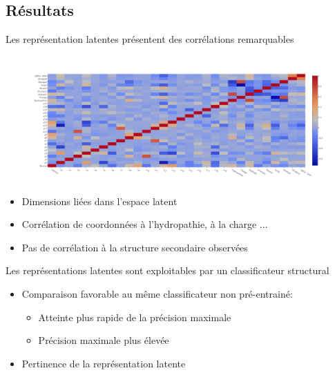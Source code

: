 \documentclass{beamer}
\begin{document}
\subsection{Résultats}

\begin{frame}{Les représentation latentes présentent des corrélations remarquables}


    \begin{figure}
      \centering
      \includegraphics[scale=1.11]{../Figures/SingleOneRecHeatf}
    \end{figure}

    \begin{itemize}
    \item Dimensions liées dans l'espace latent\pause
    \item Corrélation de coordonnées à l'hydropathie, à la charge ...\pause
    \item Pas de corrélation à la structure secondaire observées\pause
    \end{itemize}

\end{frame}

\begin{frame}{Les représentations latentes sont exploitables par un
    classificateur structural}

    \begin{itemize}
     
    \item Comparaison favorable au même classificateur non pré-entrainé:
      \begin{itemize}
      \item Atteinte plus rapide de la précision maximale\pause
      \item Précision maximale plus élevée\pause
      \end{itemize}
    \item Pertinence de la représentation latente\pause
    \end{itemize}

 \end{frame}
\end{document}
